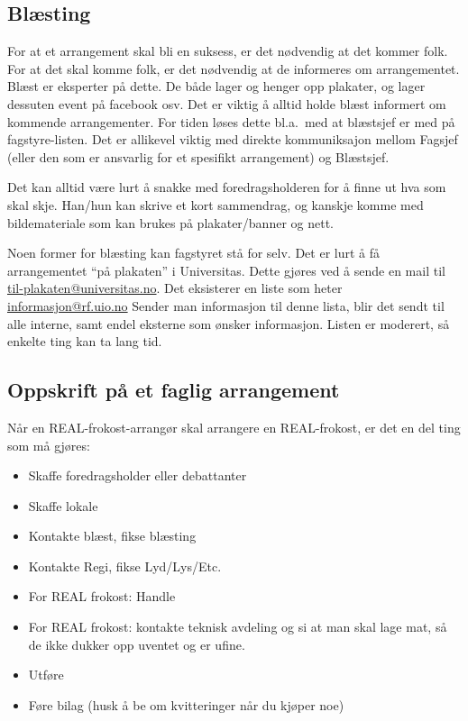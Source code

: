 \subsection{Blæsting}
For at et arrangement skal bli en suksess, er det nødvendig at det kommer
folk. For at det skal komme folk, er det nødvendig at de informeres om
arrangementet.
Blæst er eksperter på dette. De både lager og henger opp plakater, og lager
dessuten event på facebook osv.
Det er viktig å alltid holde blæst informert om kommende arrangementer.
For tiden løses dette bl.a.~med at blæstsjef er med på fagstyre-listen.
Det er allikevel viktig med direkte kommuniksajon mellom Fagsjef (eller
den som er ansvarlig for et spesifikt arrangement) og Blæstsjef.

Det kan alltid være lurt å snakke med foredragsholderen for å finne ut
hva som skal skje. Han/hun kan skrive et kort sammendrag, og kanskje komme
med bildemateriale som kan brukes på plakater/banner og nett.

Noen former for blæsting kan fagstyret stå for selv. Det er lurt å få 
arrangementet ``på plakaten'' i Universitas. Dette gjøres ved å sende
en mail til \url{til-plakaten@universitas.no}.
Det eksisterer en liste som heter \url{informasjon@rf.uio.no}
Sender man informasjon til denne lista, blir
det sendt til alle interne, samt endel eksterne som ønsker informasjon.
Listen er moderert, så enkelte ting kan ta lang tid.

\subsection{Oppskrift på et faglig arrangement}
\label{fagstyret:sec:REALfrokost-oppskrift}
Når en REAL-frokost-arrangør skal arrangere en REAL-frokost, er det en del
ting som må gjøres:
\begin{itemize}
    \item Skaffe foredragsholder eller debattanter
    \item Skaffe lokale
    \item Kontakte blæst, fikse blæsting
    \item Kontakte Regi, fikse Lyd/Lys/Etc.
    \item For REAL frokost: Handle
    \item For REAL frokost: kontakte teknisk avdeling og si at man skal
          lage mat, så de ikke dukker opp uventet og er ufine.
    \item Utføre
    \item Føre bilag (husk å be om kvitteringer når du kjøper noe)
\end{itemize}
